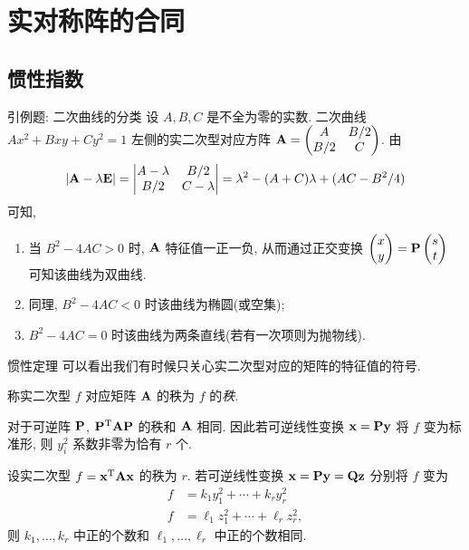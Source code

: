 \section{实对称阵的合同}

\subsection{惯性指数}

\begin{frame}{引例题: 二次曲线的分类}
	\onslide<+->
	设 $A,B,C$ 是不全为零的实数.
	二次曲线 $Ax^2+Bxy+Cy^2=1$ 左侧的实二次型对应方阵 ${\mathbf{A}}=\begin{pmatrix}
		A&B/2\\
		B/2&C
	\end{pmatrix}$.
	\onslide<+->
	由
	\[|{\mathbf{A}}-\lambda{\mathbf{E}}|=\begin{vmatrix}
		A-\lambda&B/2\\
		B/2&C-\lambda
	\end{vmatrix}=\lambda^2-(A+C)\lambda+(AC-B^2/4)\]
	可知,
	\begin{enumerate}
		\item 当 $B^2-4AC>0$ 时, ${\mathbf{A}}$ 特征值一正一负, 
		\onslide<+->
		从而通过正交变换 $\begin{pmatrix}
			x\\y
		\end{pmatrix}={\mathbf{P}}\begin{pmatrix}
			s\\t
		\end{pmatrix}$ 可知该曲线为双曲线.
		\item 同理, $B^2-4AC<0$ 时该曲线为椭圆(或空集);
		\item $B^2-4AC=0$ 时该曲线为两条直线(若有一次项则为抛物线).
	\end{enumerate}
\end{frame}


\begin{frame}{惯性定理}
	\onslide<+->
	可以看出我们有时候只关心实二次型对应的矩阵的特征值的符号.
	\onslide<+->
	\begin{definition}
		称实二次型 $f$ 对应矩阵 ${\mathbf{A}}$ 的秩为 $f$ 的\emph{秩}.
	\end{definition}
	\onslide<+->
	对于可逆阵 ${\mathbf{P}}$, ${\mathbf{P}}^{\mathrm{T}}{\mathbf{A}}{\mathbf{P}}$ 的秩和 ${\mathbf{A}}$ 相同.
	\onslide<+->
	因此若可逆线性变换 ${\mathbf{x}}={\mathbf{P}}{\mathbf{y}}$ 将 $f$ 变为标准形, 则 $y_i^2$ 系数非零为恰有 $r$ 个.
	\onslide<+->
	\begin{theorem}[惯性定理]
		设实二次型 $f={\mathbf{x}}^{\mathrm{T}}{\mathbf{A}}{\mathbf{x}}$ 的秩为 $r$.
		若可逆线性变换 ${\mathbf{x}}={\mathbf{P}}{\mathbf{y}}={\mathbf{Q}}{\mathbf{z}}$ 分别将 $f$ 变为
		\begin{align*}
			f&=k_1y_1^2+\cdots+k_ry_r^2\\
			f&=\ell_1z_1^2+\cdots+\ell_rz_r^2,
		\end{align*}
		则 $k_1,\dots,k_r$ 中正的个数和 $\ell_1,\dots,\ell_r$ 中正的个数相同.
	\end{theorem}
\end{frame}



